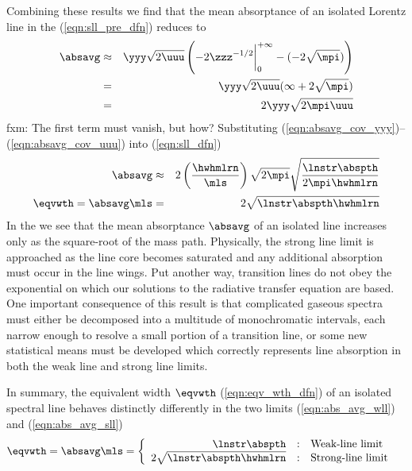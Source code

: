 \documentclass[12pt]{article}
\begin{document}
Combining these results we find that the mean absorptance of an
isolated Lorentz line in the 
(\ref{eqn:sll_pre_dfn}) reduces to 
\begin{eqnarray}
\absavg & \approx & 
\yyy \sqrt{2 \uuu} \left(
-2 \zzz^{-1/2} \bigg|_{0}^{+\infty} 
- (- 2 \sqrt{\mpi}) \right)
\nonumber \\
& = & 
\yyy \sqrt{2 \uuu} ( \infty + 2 \sqrt{\mpi} ) \nonumber \\
& = & 
2 \yyy \sqrt{2 \mpi \uuu}
\label{eqn:sll_dfn}
\end{eqnarray}
fxm: The first term must vanish, but how?
Substituting (\ref{eqn:absavg_cov_yyy})--(\ref{eqn:absavg_cov_uuu}) 
into (\ref{eqn:sll_dfn})
\begin{eqnarray}
\absavg 
& \approx & 
2 \left( \frac{\hwhmlrn}{\mls} \right) \sqrt{2 \mpi} 
\sqrt{ \frac{\lnstr \abspth}{2 \mpi \hwhmlrn} }
\nonumber \\
\eqvwth = \absavg \mls
& = & 
2 \sqrt{ \lnstr \abspth \hwhmlrn }
\label{eqn:abs_avg_sll}
\end{eqnarray}
In the  we see that the mean absorptance 
$\absavg$ of an isolated line increases only as the square-root of the 
mass path.
Physically, the strong line limit is approached as the line core
becomes saturated and any additional absorption must occur in the line
wings. 
Put another way, transition lines do not obey the exponential
 on which our solutions to the radiative
transfer equation are based.
One important consequence of this result is that complicated gaseous  
spectra must either be decomposed into a multitude of monochromatic
intervals, each narrow enough to resolve a small portion of a
transition line, or some new statistical means must be developed which 
correctly represents line absorption in both the weak line and strong
line limits.

In summary, the equivalent width $\eqvwth$ (\ref{eqn:eqv_wth_dfn})  of
an isolated spectral line behaves distinctly differently in the two
limits (\ref{eqn:abs_avg_wll}) and (\ref{eqn:abs_avg_sll})
\begin{eqnarray}
\eqvwth = \absavg \mls & = \left\{
\begin{array}{r@{\quad:\quad}ll}
\lnstr \abspth & \mbox{Weak-line limit} \\
2 \sqrt{ \lnstr \abspth \hwhmlrn } & \mbox{Strong-line limit}
\end{array} \right.
\label{eqn:eqv_wth_lmt}
\end{eqnarray}
\end{document}
